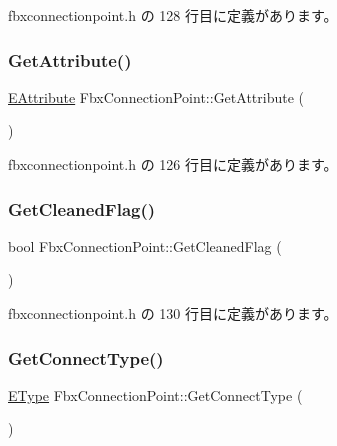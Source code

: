  fbxconnectionpoint.\+h の 128 行目に定義があります。

\mbox{\label{class_fbx_connection_point_aff1e26fd64fbb4e46cea583678a9ba5c}} 
\subsubsection{\texorpdfstring{Get\+Attribute()}{GetAttribute()}}
{\footnotesize\ttfamily \hyperlink{class_fbx_connection_point_a599eb600e5927fb0e7aaea2ee0b999a3}{E\+Attribute} Fbx\+Connection\+Point\+::\+Get\+Attribute (\begin{DoxyParamCaption}{ }\end{DoxyParamCaption})\hspace{0.3cm}{\ttfamily [inline]}}



 fbxconnectionpoint.\+h の 126 行目に定義があります。

\mbox{\label{class_fbx_connection_point_a0413ccec6fb43355582468dfd6b195b9}} 
\subsubsection{\texorpdfstring{Get\+Cleaned\+Flag()}{GetCleanedFlag()}}
{\footnotesize\ttfamily bool Fbx\+Connection\+Point\+::\+Get\+Cleaned\+Flag (\begin{DoxyParamCaption}{ }\end{DoxyParamCaption})\hspace{0.3cm}{\ttfamily [inline]}}



 fbxconnectionpoint.\+h の 130 行目に定義があります。

\mbox{\label{class_fbx_connection_point_a16e84c648b97cdb86c5615c2a9a50c68}} 
\subsubsection{\texorpdfstring{Get\+Connect\+Type()}{GetConnectType()}}
{\footnotesize\ttfamily \hyperlink{class_fbx_connection_point_a152767d2d289717698ab68d808f979b5}{E\+Type} Fbx\+Connection\+Point\+::\+Get\+Connect\+Type (\begin{DoxyParamCaption}{ }\end{DoxyParamCaption})\hspace{0.3cm}{\ttfamily [inline]}}



